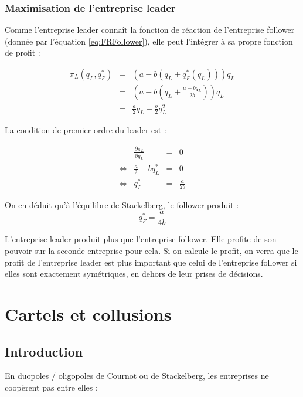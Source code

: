 \documentclass[
]{book}
\theoremstyle{definition}
\theoremstyle{definition}
\theoremstyle{definition}
\theoremstyle{definition}
\theoremstyle{remark}
\begin{document}
\hypertarget{maximisation-de-lentreprise-leader}{%
\subsubsection{Maximisation de l'entreprise leader}\label{maximisation-de-lentreprise-leader}}

Comme l'entreprise leader connaît la fonction de réaction de l'entreprise follower (donnée par l'équation \eqref{eq:FRFollower}), elle peut l'intégrer à sa propre fonction de profit :

\[
\begin{array}{rcl}
\pi_L(q_L, q_F^*) &=& \left(a-b(q_L+q_F^*(q_L))\right)q_L\\
 &=& \left(a-b\left(q_L+\frac{a-bq_L}{2b}\right)\right)q_L\\
 &=& \frac{a}{2}q_L-\frac{b}{2}q_L^2
\end{array}
\]

La condition de premier ordre du leader est :

\[
\begin{array}{crcl}
&\frac{\partial \pi_L}{\partial q_L}&=&0\\
\Leftrightarrow & \frac{a}{2}-bq_L^* &=& 0\\
\Leftrightarrow & q_L^* &=& \frac{a}{2b}
\end{array}
\]

On en déduit qu'à l'équilibre de Stackelberg, le follower produit :
\[
q_F^*=\frac{a}{4b}
\]

L'entreprise leader produit plus que l'entreprise follower.
Elle profite de son pouvoir sur la seconde entreprise pour cela.
Si on calcule le profit, on verra que le profit de l'entreprise leader est plus important que celui de l'entreprise follower si elles sont exactement symétriques, en dehors de leur prises de décisions.

\hypertarget{cartels-et-collusions}{%
\section{Cartels et collusions}\label{cartels-et-collusions}}

\hypertarget{introduction-2}{%
\subsection{Introduction}\label{introduction-2}}

En duopoles / oligopoles de Cournot ou de Stackelberg, les entreprises ne coopèrent pas entre elles :
\end{document}
